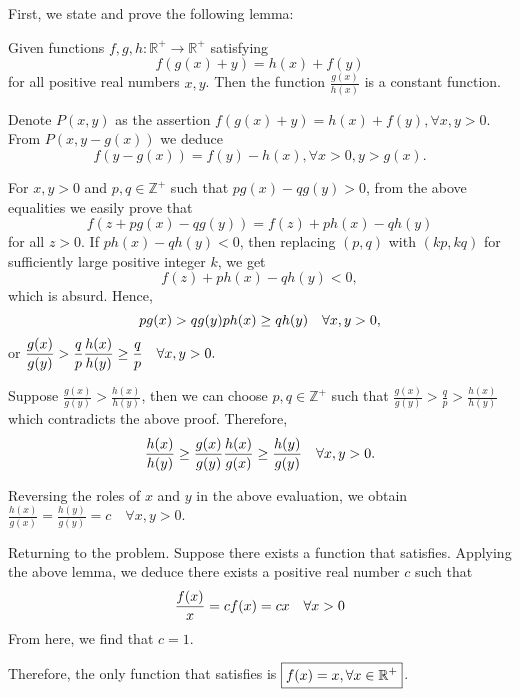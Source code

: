 \documentclass[11pt]{scrartcl}
\begin{document}
\begin{itemize}[label=, leftmargin=0em, itemsep=0.2em]
\begin{sol}
        First, we state and prove the following lemma:
        \begin{lemma}
            Given functions $f, g, h: \mathbb{R}^{+} \to \mathbb{R}^{+}$ satisfying
            $$
            f(g(x)+y)=h(x)+f(y)
            $$
            for all positive real numbers $x, y$. Then the function $\frac{g(x)}{h(x)}$ is a constant function.
        \end{lemma}
        \begin{pro}
            Denote $P(x, y)$ as the assertion $f(g(x)+y)=h(x)+f(y), \forall x, y>0$. From $P(x, y-g(x))$ we deduce
                $$
                f(y-g(x))=f(y)-h(x), \forall x>0, y>g(x) .
                $$

                For $x, y>0$ and $p, q \in \mathbb{Z}^{+}$ such that $p g(x)-q g(y)>0$, from the above equalities we easily prove that
                $$
                f(z+p g(x)-q g(y))=f(z)+p h(x)-q h(y)
                $$
                for all $z>0$. If $p h(x)-q h(y)<0$, then replacing $(p, q)$ with $(k p, k q)$ for sufficiently large positive integer $k$, we get
                $$
                f(z)+p h(x)-q h(y)<0,
                $$
                which is absurd. Hence,
                $$
                p g(x)>q g(y) \ra p h(x) \geq q h(y) \quad \forall x, y>0,
                $$
                or
                $
                \frac{g(x)}{g(y)}>\frac{q}{p} \ra \frac{h(x)}{h(y)} \geq \frac{q}{p} \quad \forall x, y>0 .
                $

                Suppose $\frac{g(x)}{g(y)}>\frac{h(x)}{h(y)}$, then we can choose $p, q \in \mathbb{Z}^{+}$ such that
                $ 
                \frac{g(x)}{g(y)}>\frac{q}{p}>\frac{h(x)}{h(y)}
                $
                which contradicts the above proof. Therefore,
                $$
                \frac{h(x)}{h(y)} \geq \frac{g(x)}{g(y)} \ra \frac{h(x)}{g(x)} \geq \frac{h(y)}{g(y)} \quad \forall x, y>0 .
                $$

                Reversing the roles of $x$ and $y$ in the above evaluation, we obtain $\frac{h(x)}{g(x)}=\frac{h(y)}{g(y)}=c \quad \forall x, y>0$.
        \end{pro}
        Returning to the problem. Suppose there exists a function that satisfies.
        Applying the above lemma, we deduce there exists a positive real number $c$ such that
        $$
        \frac{f(x)}{x}=c \ra f(x)=c x \quad \forall x>0
        $$
        From here, we find that $c = 1$. 
        
        Therefore, the only function that satisfies is $\boxed{f(x) = x, \forall x\in \mathbb{R^+}}$.


\end{sol}
\end{itemize}
\end{document}
